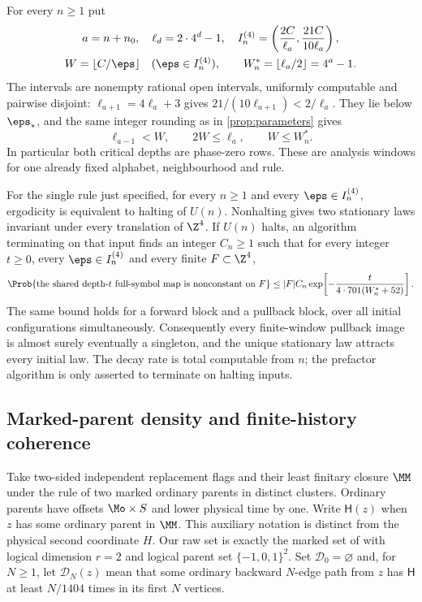 For every $n\ge1$ put
\[
 \begin{gathered}
 a=n+n_0,\quad \ell_d=2\cdot4^d-1,\quad
 I_n^{(4)}=\left(\frac{2C}{\ell_a},\frac{21C}{10\ell_a}\right),\\
 W=\lfloor C/\eps\rfloor\quad(\eps\in I_n^{(4)}),\qquad
 W_n^*=\lfloor\ell_a/2\rfloor=4^a-1.
 \end{gathered}
\]
The intervals are nonempty rational open intervals, uniformly computable and pairwise disjoint: $\ell_{a+1}=4\ell_a+3$ gives $21/(10\ell_{a+1})<2/\ell_a$. They lie below $\eps_*$, and the same integer rounding as in \cref{prop:parameters} gives
\[
 \ell_{a-1}<W,\qquad 2W\le\ell_a,\qquad W\le W_n^*.
\]
In particular both critical depths are phase-zero rows. These are analysis windows for one already fixed alphabet, neighbourhood and rule.

\begin{theorem}\label{thm:lower}
For the single rule just specified, for every $n\ge1$ and every $\eps\in I_n^{(4)}$, ergodicity is equivalent to halting of $U(n)$. Nonhalting gives two stationary laws invariant under every translation of $\Z^4$. If $U(n)$ halts, an algorithm terminating on that input finds an integer $C_n\ge1$ such that for every integer $t\ge0$, every $\eps\in I_n^{(4)}$ and every finite $F\subset\Z^4$,
\[
 \Prob\{\text{the shared depth-$t$ full-symbol map is nonconstant on }F\}
 \le |F|C_n\exp\!\left[-\frac{t}{4\cdot701(W_n^*+52)}\right].
\]
The same bound holds for a forward block and a pullback block, over all initial configurations simultaneously. Consequently every finite-window pullback image is almost surely eventually a singleton, and the unique stationary law attracts every initial law. The decay rate is total computable from $n$; the prefactor algorithm is only asserted to terminate on halting inputs.
\end{theorem}

\subsection{Marked-parent density and finite-history coherence}

Take two-sided independent replacement flags and their least finitary closure $\MM$ under the rule of two marked ordinary parents in distinct clusters. Ordinary parents have offsets $\Mo\times S$ and lower physical time by one. Write $\mathsf H(z)$ when $z$ has some ordinary parent in $\MM$. This auxiliary notation is distinct from the physical second coordinate $H$. Our raw set is exactly the marked set of \cite[Section~12]{DMforgetLower} with logical dimension $r=2$ and logical parent set $\{-1,0,1\}^2$. Set $\mathcal D_0=\varnothing$ and, for $N\ge1$, let $\mathcal D_N(z)$ mean that some ordinary backward $N$-edge path from $z$ has $\mathsf H$ at least $N/1404$ times in its first $N$ vertices.

